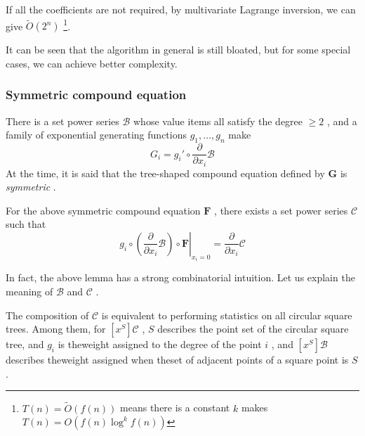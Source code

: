 If all the coefficients are not required, by multivariate Lagrange inversion, we can give $ \tilde O( 2 ^n) $ \footnote { $ T(n) = \tilde O(f(n)) $ means there is a constant $ k $ makes $ T(n) = O(f(n) \log ^kf(n)) $ }.

\begin { theorem } \label { algocomp }
For a $ \ mathbf G $ tree composite equation defined $ \ mathbf F. $ , Through $ \ tilde are O ( 2 ^ n-) $ pretreatment given $ H \ in  \ A \ { X_ . 1 , \ DOTS , x_n \} $ Inquiry $ [x^S] H( \mathbf F) $ can be completed within $ \Theta (|S|^ 22 ^{|S|}) $ .
\end { theorem }

It can be seen that the algorithm in general is still bloated, but for some special cases, we can achieve better complexity.

\subsubsection { Symmetric compound equation }

\begin { definition }
There is a set power series $ \mathscr B $ whose value items all satisfy the degree $ \ge  2 $ , and a family of exponential generating functions $ g_ 1 , \dots ,g_n $ make
$$
G_i=g_i' \circ  \frac { \partial }{ \partial x_i} \mathscr B
$$
At the time, it is said that the tree-shaped compound equation defined by $ \mathbf G $ is \emph { symmetric }.
\end { definition }

\begin { lemma }
For the above symmetric compound equation $ \mathbf F $ , there exists a set power series $ \mathscr C $ such that
$$
\left . g_i \circ  \left ( \frac { \partial }{ \partial x_i} \mathscr B \right ) \circ  \mathbf F \right |_{x_i=0} = \frac { \partial }{ \partial x_i} \mathscr C
$$
\end { lemma }

In fact, the above lemma has a strong combinatorial intuition. Let us explain the meaning of $ \mathscr B $ and $ \mathscr C $ .

The composition of $ \mathscr C $ is equivalent to performing statistics on all circular square trees. Among them, for $ [x^S] \mathscr C $ , $ S $ describes the point set of the circular square tree, and $ g_i $ is theweight assigned to the degree of the point $ i $ , and $ [x^ S] \mathscr B $ describes theweight assigned when theset of adjacent points of a square point is $ S $ .

